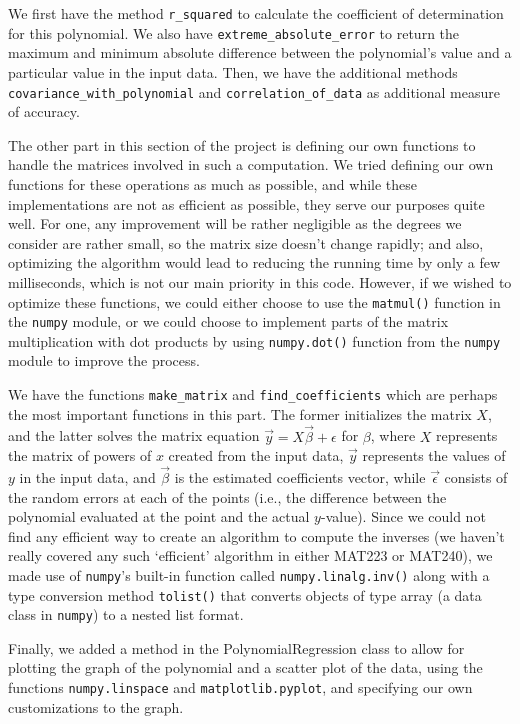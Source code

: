 \documentclass[12pt]{article}
\begin{document}
\begin{enumerate}
\begin{text}
We first have the method \texttt{r\_squared} to calculate the coefficient of determination for this polynomial. We also have \texttt{extreme\_absolute\_error} to return the maximum and minimum absolute difference between the polynomial's value and a particular value in the input data. Then, we have the additional methods \texttt{covariance\_with\_polynomial} and \texttt{correlation\_of\_data} as additional measure of accuracy.

The other part in this section of the project is defining our own functions to handle the matrices involved in such a computation. We tried defining our own functions for these operations as much as possible, and while these implementations are not as efficient as possible, they serve our purposes quite well. For one, any improvement will be rather negligible as the degrees we consider are rather small, so the matrix size doesn't change rapidly; and also, optimizing the algorithm would lead to reducing the running time by only a few milliseconds, which is not our main priority in this code. However, if we wished to optimize these functions, we could either choose to use the \texttt{matmul()} function in the \texttt{numpy} module, or we could choose to implement parts of the matrix multiplication with dot products by using \texttt{numpy.dot()} function from the \texttt{numpy} module to improve the process.

We have the functions \texttt{make\_matrix} and \texttt{find\_coefficients} which are perhaps the most important functions in this part. The former initializes the matrix $X$, and the latter solves the matrix equation $\vec{y} = X\vec{\beta} + \epsilon$ for $\beta$, where $X$ represents the matrix of powers of $x$ created from the input data, $\vec{y}$ represents the values of $y$ in the input data, and $\vec{\beta}$ is the estimated coefficients vector, while $\vec{\epsilon}$ consists of the random errors at each of the points (i.e., the difference between the polynomial evaluated at the point and the actual $y$-value). Since we could not find any efficient way to create an algorithm to compute the inverses (we haven't really covered any such `efficient' algorithm in either MAT223 or MAT240), we made use of \texttt{numpy}'s built-in function called \texttt{numpy.linalg.inv()} along with a type conversion method \texttt{tolist()} that converts objects of type array (a data class in \texttt{numpy}) to a nested list format.

Finally, we added a method in the PolynomialRegression class to allow for plotting the graph of the polynomial and a scatter plot of the data, using the functions \texttt{numpy.linspace} and \texttt{matplotlib.pyplot}, and specifying our own customizations to the graph.


\end{text}
\end{enumerate}
\end{document}
